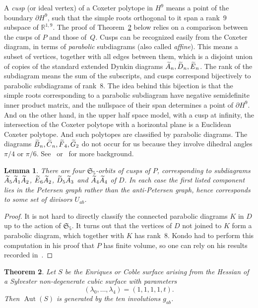\documentclass[11pt]{article}
\newtheorem{theo}{Theorem}[section]
\newtheorem{lemm}[theo]{Lemma}
\theoremstyle{definition}
\numberwithin{equation}{section}
\numberwithin{figure}{section}
\numberwithin{table}{section}
\let\oldtilde\tilde
\renewcommand*\tilde[1]{\mathchoice{\widetilde{#1}}{\widetilde{#1}}{\oldtilde{#1}}{\oldtilde{#1}}}
\newcommand*\Gtilde{\tilde G}
\newcommand*\Ftilde{\tilde F}
\newcommand*\Atilde{\tilde A}
\newcommand*\Btilde{\tilde B}
\newcommand*\Ctilde{\tilde C}
\newcommand*\Dtilde{\tilde D}
\newcommand*\Etilde{\tilde E}
\newcommand*\R{\mathbb{R}}
\DeclareMathOperator{\Aut}{Aut}
\newcommand{\frakS}{\mathfrak{S}}
\begin{document}
A \emph{cusp} (or ideal vertex) of a Coxeter polytope in $H^9$ means a point of the boundary $\partial H^9$, such that the simple roots orthogonal to it span a rank~$9$ subspace of $\R^{1,9}$. The proof of Theorem~\ref{ThmAutGenerators} below relies on a comparison between the cusps of $P$ and those of~$Q$. Cusps can be recognized easily from the Coxeter diagram, in terms of \emph{parabolic} subdiagrams (also called \emph{affine}). This means a subset of vertices, together with all edges between them, which is a disjoint union of copies of the standard extended Dynkin diagrams $\Atilde_n,\Dtilde_n,\Etilde_n$. The rank of the subdiagram means the sum of the subscripts, and cusps correspond bijectively to parabolic subdiagrams of rank~$8$. The idea behind this bijection is that the simple roots corresponding to a parabolic subdiagram have negative semidefinite inner product matrix, and the nullspace of their span determines a point of $\partial H^9$. And on the other hand, in the upper half space model, with a cusp at infinity, the intersection of the Coxeter polytope with a horizontal plane is a Euclidean Coxeter polytope. And such polytopes are classified by parabolic diagrams. The diagrams $\Btilde_n,\Ctilde_n,\Ftilde_4,\Gtilde_2$ do not occur for us because they involve dihedral angles $\pi/4$ or $\pi/6$. See~\cite[Sections~2--3]{Vinberg} or~\cite{DolgachevBulletin} for more background.

\begin{lemm}\label{LemCusps}
There are four $\frakS_5$-orbits of cusps of $P$, corresponding to subdiagrams $\Atilde_5\Atilde_1\Atilde_2$, $\Etilde_6\Atilde_2$, $\Dtilde_5\Atilde_3$ and $\Atilde_4\Atilde_4$ of $D$. In each case the first listed component lies in the Petersen graph rather than the anti-Petersen graph, hence corresponds to some set of divisors $U_{ab}$.
\end{lemm}

\begin{proof}
It is not hard to directly classify the connected parabolic diagrams $K$ in $D$ up to the action of $\frakS_5$. It turns out that the vertices of $D$ not joined to $K$ form a parabolic diagram, which together with $K$ has rank~$8$. Kondo had to perform this computation in his proof that $P$ has finite volume, so one can rely on his results recorded in~\cite[p.~226]{Kondo}.
\end{proof}

\begin{theo}\label{ThmAutGenerators}
Let $S$ be the Enriques or Coble surface arising from the Hessian of a Sylvester non-degenerate cubic surface with parameters
\begin{equation*}
(\lambda_0,\dots,\lambda_4)=(1,1,1,1,t).
\end{equation*}
Then $\Aut(S)$ is generated by the ten involutions $g_{ab}$.
\end{theo}
\end{document}
